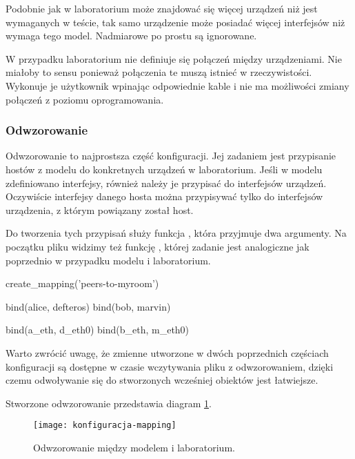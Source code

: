 \documentclass[00-praca-magisterska.tex]{subfiles}
\begin{document}
Podobnie jak w laboratorium może znajdować się więcej urządzeń niż jest
wymaganych w teście, tak samo urządzenie może posiadać więcej interfejsów niż
wymaga tego model. Nadmiarowe po prostu są ignorowane.

W przypadku laboratorium nie definiuje się połączeń między urządzeniami. Nie
miałoby to sensu ponieważ połączenia te muszą istnieć w rzeczywistości.
Wykonuje je użytkownik wpinając odpowiednie kable i nie ma możliwości zmiany
połączeń z poziomu oprogramowania.

\label{arete-master-config-mapping}
\subsubsection{Odwzorowanie}

Odwzorowanie to najprostsza część konfiguracji. Jej zadaniem jest przypisanie
hostów z modelu do konkretnych urządzeń w laboratorium. Jeśli w modelu
zdefiniowano interfejsy, również należy je przypisać do interfejsów urządzeń.
Oczywiście interfejsy danego hosta można przypisywać tylko do interfejsów
urządzenia, z którym powiązany został host.

Do tworzenia tych przypisań służy funkcja , która przyjmuje dwa
argumenty. Na początku pliku widzimy też funkcję , której
zadanie jest analogiczne jak poprzednio w przypadku modelu i laboratorium.

\begin{pythoncode}
  create_mapping('peers-to-myroom')

  bind(alice, defteros)
  bind(bob,   marvin)

  bind(a_eth, d_eth0)
  bind(b_eth, m_eth0)
\end{pythoncode}

Warto zwrócić uwagę, że zmienne utworzone w dwóch poprzednich częściach
konfiguracji są dostępne w czasie wczytywania pliku z odwzorowaniem, dzięki czemu
odwoływanie się do stworzonych wcześniej obiektów jest łatwiejsze.

Stworzone odwzorowanie przedstawia diagram \ref{fig:konfiguracja-mapping}.

\begin{figure}[htb]
\begin{center}
\leavevmode
\texttt{[image: konfiguracja-mapping]}
\end{center}
\caption{Odwzorowanie między modelem i laboratorium.}
\label{fig:konfiguracja-mapping}
\end{figure}
\end{document}

